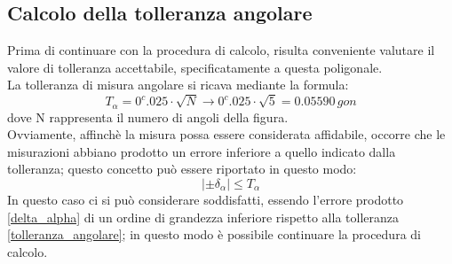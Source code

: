\subsection{Calcolo della tolleranza angolare}
Prima di continuare con la procedura di calcolo, risulta conveniente valutare il valore di tolleranza accettabile, specificatamente a questa poligonale.\\
La tolleranza di misura angolare si ricava mediante la formula: 
\begin{equation} \label{tolleranza_angolare}
    T_\alpha = 0^c.025 \cdot\sqrt{N} \xrightarrow{} 0^c.025 \cdot \sqrt{5} = 0.05590 \,gon
\end{equation}
dove N rappresenta il numero di angoli della figura.\\
Ovviamente, affinchè la misura possa essere considerata affidabile, occorre che le misurazioni abbiano prodotto un errore inferiore a quello indicato dalla tolleranza; questo concetto può essere riportato in questo modo:
\begin{equation}
    |\pm \delta_\alpha| \leq T_\alpha
\end{equation}
In questo caso ci si può considerare soddisfatti, essendo l'errore prodotto \ref{delta_alpha} di un ordine di grandezza inferiore rispetto alla tolleranza \ref{tolleranza_angolare}; in questo modo è possibile continuare la procedura di calcolo.





